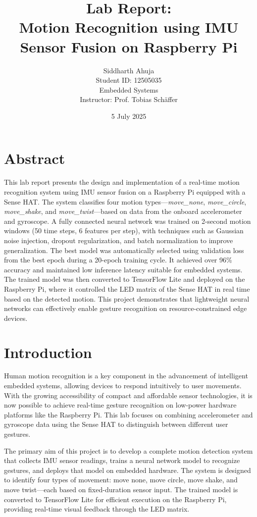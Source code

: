 \documentclass[a4paper,12pt]{article}
\title{Lab Report:\\ \textbf{Motion Recognition using IMU Sensor Fusion on Raspberry Pi}}
\author{Siddharth Ahuja \\ Student ID: 12505035 \\ Embedded Systems \\ Instructor: Prof. Tobias Schäffer}
\date{5 July 2025}
\begin{document}
\maketitle
\section*{Abstract}

This lab report presents the design and implementation of a real-time motion recognition system using IMU sensor fusion on a Raspberry Pi equipped with a Sense HAT. The system classifies four motion types—\textit{move\_none}, \textit{move\_circle}, \textit{move\_shake}, and \textit{move\_twist}—based on data from the onboard accelerometer and gyroscope. A fully connected neural network was trained on 2-second motion windows (50 time steps, 6 features per step), with techniques such as Gaussian noise injection, dropout regularization, and batch normalization to improve generalization. The best model was automatically selected using validation loss from the best epoch during a 20-epoch training cycle. It achieved over 96\% accuracy and maintained low inference latency suitable for embedded systems. The trained model was then converted to TensorFlow Lite and deployed on the Raspberry Pi, where it controlled the LED matrix of the Sense HAT in real time based on the detected motion. This project demonstrates that lightweight neural networks can effectively enable gesture recognition on resource-constrained edge devices.


\section{Introduction}
Human motion recognition is a key component in the advancement of intelligent embedded systems, allowing devices to respond intuitively to user movements. With the growing accessibility of compact and affordable sensor technologies, it is now possible to achieve real-time gesture recognition on low-power hardware platforms like the Raspberry Pi. This lab focuses on combining accelerometer and gyroscope data using the Sense HAT to distinguish between different user gestures.

The primary aim of this project is to develop a complete motion detection system that collects IMU sensor readings, trains a neural network model to recognize gestures, and deploys that model on embedded hardware. The system is designed to identify four types of movement: move none, move circle, move shake, and move twist—each based on fixed-duration sensor input. The trained model is converted to TensorFlow Lite for efficient execution on the Raspberry Pi, providing real-time visual feedback through the LED matrix.
\end{document}
